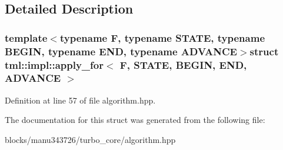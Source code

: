 \subsection{Detailed Description}
\subsubsection*{template$<$typename F, typename S\+T\+A\+T\+E, typename B\+E\+G\+I\+N, typename E\+N\+D, typename A\+D\+V\+A\+N\+C\+E$>$struct tml\+::impl\+::apply\+\_\+for$<$ F, S\+T\+A\+T\+E, B\+E\+G\+I\+N, E\+N\+D, A\+D\+V\+A\+N\+C\+E $>$}



Definition at line 57 of file algorithm.\+hpp.



The documentation for this struct was generated from the following file\+:\begin{DoxyCompactItemize}
\item 
blocks/manu343726/turbo\+\_\+core/algorithm.\+hpp\end{DoxyCompactItemize}
